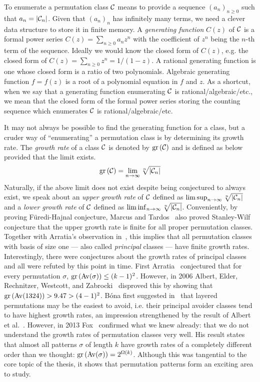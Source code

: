 \documentclass[12pt, a4paper, twoside]{report}
\begin{document}
To enumerate a permutation class $\mathcal{C}$ means to provide a sequence $(a_n)_{n\geq 0}$ such that $a_n = |\mathcal{C}_n|$. Given that $(a_n)_n$ has infinitely many terms, we need a clever data structure to store it in finite memory. A \emph{generating function} $C(z)$ of $\mathcal{C}$ is a formal power series $C(z) = \sum_{n\geq 0}a_nz^n$ with the coefficient of $z^n$ being the $n$-th term of the sequence. Ideally we would know the closed form of $C(z)$, e.g. the closed form of $C(z) = \sum_{n\geq 0}z^n = 1/(1-z)$. A rational generating function is one whose closed form is a ratio of two polynomials. Algebraic generating function $f = f(z)$ is a root of a polynomial equation in $f$ and $z$. As a shortcut, when we say that a generating function enumerating $\mathcal{C}$ is rational/algebraic/etc., we mean that the closed form of the formal power series storing the counting sequence which enumerates $\mathcal{C}$ is rational/algebraic/etc.

It may not always be possible to find the generating function for a class, but a cruder way of ``enumerating'' a permutation class is by determining its growth rate. The \emph{growth rate} of a class $\mathcal{C}$ is denoted by $\mathrm{gr}\left(\mathcal{C}\right)$ and is defined as below provided that the limit exists.
$$\mathrm{gr}\left(\mathcal{C}\right) = \lim_{n\to\infty}\sqrt[n]{|\mathcal{C}_n|}$$
Naturally, if the above limit does not exist despite being conjectured to always exist, we speak about an \emph{upper growth rate} of $\mathcal{C}$ defined as $\lim\sup_{n\to\infty}\sqrt[n]{|\mathcal{C}_n|}$ and a \emph{lower growth rate} of $\mathcal{C}$ defined as $\lim\inf_{n\to\infty}\sqrt[n]{|\mathcal{C}_n|}$. Conveniently, by proving F\"{u}redi-Hajnal conjecture, Marcus and Tardos~\cite{marcus04growthrate} also proved Stanley-Wilf conjecture that the upper growth rate is finite for all proper permutation classes. Together with Arratia's observation in~\cite{arratia1999}, this implies that all permutation classes with basis of size one --- also called \emph{principal} classes --- have finite growth rates. Interestingly, there were conjectures about the growth rates of principal classes and all were refuted by this point in time. First Arratia~\cite{arratia1999} conjectured that for every permutation $\sigma$, $\mathrm{gr}\left(\mathrm{Av}(\sigma)\right) \leq (k-1)^2$. However, in 2006 Albert, Elder, Rechnitzer, Westcott, and Zabrocki~\cite{albert2006wilf} disproved this by showing that $\mathrm{gr}\left(\mathrm{Av}(1324)\right) > 9.47 > (4-1)^2$. B\'ona first suggested in~\cite{bona2005wilf} that layered permutations may be the easiest to avoid, i.e. their principal avoider classes tend to have highest growth rates, an impression strengthened by the result of Albert et al.~\cite{albert2006wilf}. However, in 2013 Fox~\cite{fox2013wilf} confirmed what we knew already: that we do not understand the growth rates of permutation classes very well. His result states that almost all patterns $\sigma$ of length $k$ have growth rates of a completely different order than we thought: $\mathrm{gr}\left(\mathrm{Av}(\sigma)\right) = 2^{\Omega(k)}$. Although this was tangential to the core topic of the thesis, it shows that permutation patterns form an exciting area to study.
\end{document}
